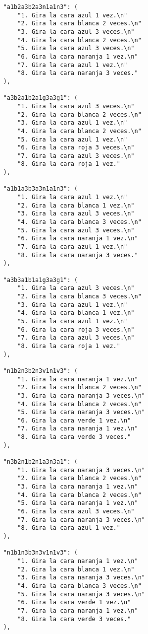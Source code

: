 \begin{lstlisting}
    "a1b2a3b2a3n1a1n3": (
        "1. Gira la cara azul 1 vez.\n"
        "2. Gira la cara blanca 2 veces.\n"
        "3. Gira la cara azul 3 veces.\n"
        "4. Gira la cara blanca 2 veces.\n"
        "5. Gira la cara azul 3 veces.\n"
        "6. Gira la cara naranja 1 vez.\n"
        "7. Gira la cara azul 1 vez.\n"
        "8. Gira la cara naranja 3 veces."
    ),
    
    "a3b2a1b2a1g3a3g1": (
        "1. Gira la cara azul 3 veces.\n"
        "2. Gira la cara blanca 2 veces.\n"
        "3. Gira la cara azul 1 vez.\n"
        "4. Gira la cara blanca 2 veces.\n"
        "5. Gira la cara azul 1 vez.\n"
        "6. Gira la cara roja 3 veces.\n"
        "7. Gira la cara azul 3 veces.\n"
        "8. Gira la cara roja 1 vez."
    ),
    
    "a1b1a3b3a3n1a1n3": (
        "1. Gira la cara azul 1 vez.\n"
        "2. Gira la cara blanca 1 vez.\n"
        "3. Gira la cara azul 3 veces.\n"
        "4. Gira la cara blanca 3 veces.\n"
        "5. Gira la cara azul 3 veces.\n"
        "6. Gira la cara naranja 1 vez.\n"
        "7. Gira la cara azul 1 vez.\n"
        "8. Gira la cara naranja 3 veces."
    ),
    
    "a3b3a1b1a1g3a3g1": (
        "1. Gira la cara azul 3 veces.\n"
        "2. Gira la cara blanca 3 veces.\n"
        "3. Gira la cara azul 1 vez.\n"
        "4. Gira la cara blanca 1 vez.\n"
        "5. Gira la cara azul 1 vez.\n"
        "6. Gira la cara roja 3 veces.\n"
        "7. Gira la cara azul 3 veces.\n"
        "8. Gira la cara roja 1 vez."
    ),
    
    "n1b2n3b2n3v1n1v3": (
        "1. Gira la cara naranja 1 vez.\n"
        "2. Gira la cara blanca 2 veces.\n"
        "3. Gira la cara naranja 3 veces.\n"
        "4. Gira la cara blanca 2 veces.\n"
        "5. Gira la cara naranja 3 veces.\n"
        "6. Gira la cara verde 1 vez.\n"
        "7. Gira la cara naranja 1 vez.\n"
        "8. Gira la cara verde 3 veces."
    ),
    
    "n3b2n1b2n1a3n3a1": (
        "1. Gira la cara naranja 3 veces.\n"
        "2. Gira la cara blanca 2 veces.\n"
        "3. Gira la cara naranja 1 vez.\n"
        "4. Gira la cara blanca 2 veces.\n"
        "5. Gira la cara naranja 1 vez.\n"
        "6. Gira la cara azul 3 veces.\n"
        "7. Gira la cara naranja 3 veces.\n"
        "8. Gira la cara azul 1 vez."
    ),
    
    "n1b1n3b3n3v1n1v3": (
        "1. Gira la cara naranja 1 vez.\n"
        "2. Gira la cara blanca 1 vez.\n"
        "3. Gira la cara naranja 3 veces.\n"
        "4. Gira la cara blanca 3 veces.\n"
        "5. Gira la cara naranja 3 veces.\n"
        "6. Gira la cara verde 1 vez.\n"
        "7. Gira la cara naranja 1 vez.\n"
        "8. Gira la cara verde 3 veces."
    ),
    

\end{lstlisting}
